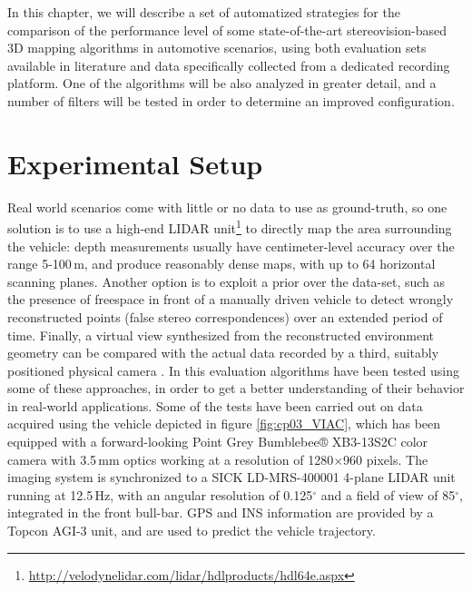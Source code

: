 In this chapter, we will describe a set of automatized strategies for the comparison of the performance level of some state-of-the-art stereovision-based 3D mapping algorithms in automotive scenarios, using both evaluation sets available in literature and data specifically collected from a dedicated recording platform. One of the algorithms will be also analyzed in greater detail, and a number of filters will be tested in order to determine an improved configuration.

\section{Experimental Setup}\label{ch:chapter03_01}

Real world scenarios come with little or no data to use as ground-truth, so one solution \citep{Morales2011, Geiger2012} is to use a high-end \ac{LIDAR} unit\footnote{\url{http://velodynelidar.com/lidar/hdlproducts/hdl64e.aspx}} to directly map the area surrounding the vehicle: depth measurements usually have centimeter-level accuracy over the range 5-100\,m, and produce reasonably dense maps, with up to 64 horizontal scanning planes. Another option is to exploit a prior over the data-set, such as the presence of freespace in front of a manually driven vehicle \citep{Steingrube2009} to detect wrongly reconstructed points (false stereo correspondences) over an extended period of time. Finally, a virtual view synthesized from the reconstructed environment geometry can be compared with the actual data recorded by a third, suitably positioned physical camera \citep{Morales2011, Morales2009}.
In this evaluation algorithms have been tested using some of these approaches, in order to get a better understanding of their behavior in real-world applications. Some of the tests have been carried out on data acquired using the vehicle depicted in figure \ref{fig:cp03_VIAC}, which has been equipped with a forward-looking Point Grey Bumblebee® XB3-13S2C color camera with 3.5\,mm optics working at a resolution of 1280$\times$960 pixels. The imaging system is synchronized to a SICK LD-MRS-400001 4-plane LIDAR unit running at 12.5\,Hz, with an angular resolution of 0.125$^\circ$ and a field of view of 85$^\circ$, integrated in the front bull-bar. GPS and INS information are provided by a Topcon AGI-3 unit, and are used to predict the vehicle trajectory.

